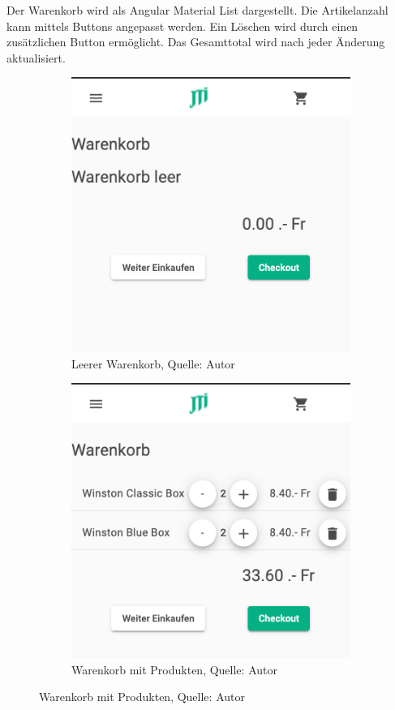 Der Warenkorb wird als Angular Material List dargestellt. Die Artikelanzahl kann mittels Buttons angepasst werden. Ein Löschen wird durch einen zusätzlichen Button ermöglicht. Das Gesamttotal wird nach jeder Änderung aktualisiert. 

\begin{figure}[H]
	\begin{subfigure}[b]{0.4\textwidth}
		\includegraphics[scale=0.4]{images/cartEmpty.PNG}
		\caption[Leerer Warenkorb]{Leerer Warenkorb, Quelle: Autor}
		\label{img: cartEmpty}
	\end{subfigure}
	\hfill
	\begin{subfigure}[b]{0.4\textwidth}
		\includegraphics[scale=0.4]{images/cartFull.PNG}
		\caption[Warenkorb mit Produkten]{Warenkorb mit Produkten, Quelle: Autor}
		\label{img: cartFull}
	\end{subfigure}
\end{figure} 
